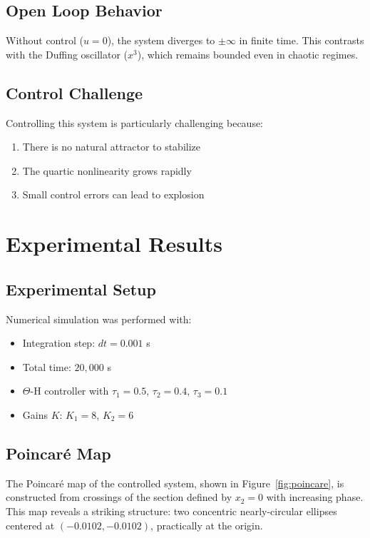 \documentclass[twocolumn]{article}
\begin{document}
\subsection{Open Loop Behavior}

Without control ($u=0$), the system diverges to $\pm\infty$ in finite 
time. This contrasts with the Duffing oscillator ($x^3$), which remains 
bounded even in chaotic regimes.

\subsection{Control Challenge}

Controlling this system is particularly challenging because:

\begin{enumerate}
    \item There is no natural attractor to stabilize
    \item The quartic nonlinearity grows rapidly
    \item Small control errors can lead to explosion
\end{enumerate}

\section{Experimental Results}
\label{sec:results}

\subsection{Experimental Setup}

Numerical simulation was performed with:
\begin{itemize}
    \item Integration step: $dt = 0.001$ s
    \item Total time: $20,000$ s
    \item $\Theta$-H controller with $\tau_1=0.5$, $\tau_2=0.4$, $\tau_3=0.1$
    \item Gains $K$: $K_1=8$, $K_2=6$
\end{itemize}

\subsection{Poincar\'e Map}

The Poincar\'e map of the controlled system, shown in Figure~\ref{fig:poincare}, 
is constructed from crossings of the section defined by $x_2 = 0$ with 
increasing phase. This map reveals a striking structure: two concentric 
nearly-circular ellipses centered at $(-0.0102, -0.0102)$, practically 
at the origin.
\end{document}
